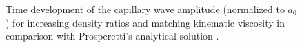 \begin{figure}[t]
\centering
   \caption{Time development of the capillary wave amplitude (normalized to $a_0$) for increasing density ratios and matching kinematic viscosity in comparison with Prosperetti's analytical solution \cite{Prosperetti_1981}.}
   \label{fig:cap_wave}
\end{figure}

